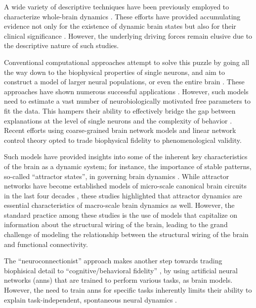 \documentclass{article}
\begin{document}
A wide variety of descriptive techniques have been previously employed to characterize whole-brain dynamics \citep{smith2012temporally, vidaurre2017brain, liu2013time, chen2018human}.
These efforts have provided accumulating evidence not only for the existence of dynamic brain states but also for their clinical
significance \citep{hutchison2013dynamic, barttfeld2015signature, meer2020movie}.
However, the underlying driving forces remain elusive due to the descriptive nature of such studies.

Conventional computational approaches attempt to solve this puzzle by going all the way down to the biophysical properties of single neurons, and aim to construct a model of larger neural populations, or even the entire brain
\citep{breakspear2017dynamic}.
These approaches have shown numerous successful applications \citep{murray2018biophysical, kriegeskorte2018cognitive, heinz2019towards}.
However, such models need to estimate a vast number of neurobiologically motivated free parameters to fit the data. This hampers their ability to effectively bridge the gap between explanations at the level of single neurons and the complexity of behavior \citep{breakspear2017dynamic}.
Recent efforts using coarse-grained brain network models \citep{schirner2022dynamic, schiff1994controlling, papadopoulos2017development, seguin2023brain} and linear network control theory  \citep{chiem2021structure, scheid2021time, gu2015controllability} opted to trade biophysical fidelity to phenomenological validity.

Such models have provided insights into some of the inherent key characteristics of the brain as a dynamic system; for instance, the importance of stable patterns, so-called ``attractor states'', in governing brain dynamics \citep{deco2012anatomy, golos2015multistability, hansen2015functional}. While attractor networks have become established models of micro-scale canonical brain circuits in the last four decades \citep{khona2022attractor}, these studies highlighted that attractor dynamics are essential characteristics of macro-scale brain dynamics as well. However, the standard practice among these studies is the use of models that capitalize on information about the structural wiring of the brain, leading to the grand challenge of modeling the relationship between the structural wiring of the brain and functional connectivity.

The ``neuroconnectionist'' approach \citep{doerig2023neuroconnectionist} makes another step towards trading biophisical detail to ``cognitive/behavioral fidelity'' \citep{kriegeskorte2018cognitive}, by using artificial neural networks (\acrshort{ann}s) that are trained to perform various tasks, as brain models. However, the need to train \acrshort{ann}s for specific tasks inherently limits their ability to explain task-independent, spontaneous neural dynamics \citep{richards2019deep}.
\end{document}
